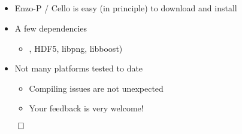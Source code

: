 \NEWSEC

\subsection{\ssStartingSummary}


\begin{frame}[fragile,label=ss-starting-summary] 
\secframetitle{\ssStartingSummary}
\begin{itemize}
\item Enzo-P / Cello is easy (in principle) to download and install
\item A few dependencies
\begin{itemize}
\item \charm, HDF5, libpng, libboost)
\end{itemize}
\item Not many platforms tested to date
\begin{itemize}
\item Compiling issues are not unexpected
\item Your feedback is very welcome!
\end{itemize}
\end{itemize}
\vfill
\centerline{$\qed$}
\end{frame}

